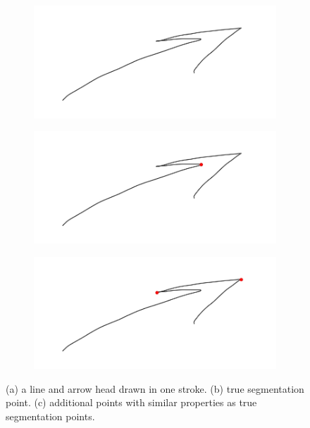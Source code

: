 \begin{figure}
	\centering
	\begin{subfigure}{0.3\textwidth}
		\centering
		\includegraphics[scale=0.2]{./img/seg_orig.jpg}
		\caption{}
	\end{subfigure}
	\begin{subfigure}{0.3\textwidth}
		\centering
		\includegraphics[scale=0.2]{./img/seg_true_seg.jpg}
		\caption{}
	\end{subfigure}
	\begin{subfigure}{0.3\textwidth}
		\centering
		\includegraphics[scale=0.2]{./img/seg_false_seg.jpg}
		\caption{}
	\end{subfigure}
	\caption{(a) a line and arrow head drawn in one stroke. (b) true segmentation point. (c) additional points with similar properties as true segmentation points.}
	\label{fig:seg_false_neg}
\end{figure}

